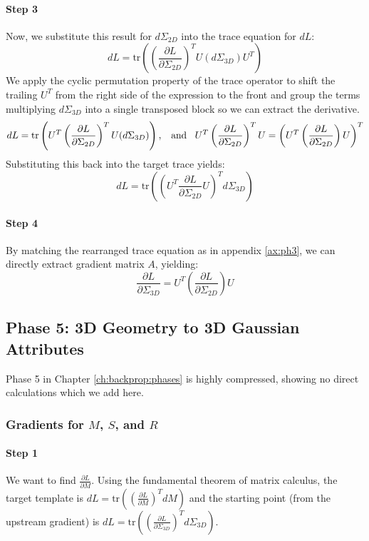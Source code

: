 \paragraph{Step 3} Now, we substitute this result for $d\Sigma_{2D}$ into the trace equation for $dL$:
$$dL = \text{tr}\left( \left(\frac{\partial L}{\partial \Sigma_{2D}}\right)^T U (d\Sigma_{3D}) U^T \right)$$
We apply the cyclic permutation property of the trace operator to shift the trailing $U^T$ from the right side of the expression to the front and group the terms multiplying $d\Sigma_{3D}$ into a single transposed block so we can extract the derivative.
$$dL = \text{tr}\left( U^T \left(\frac{\partial L}{\partial \Sigma_{2D}}\right)^T U (d\Sigma_{3D}) \right), \hspace{3mm}\text{and}\hspace{3mm}
U^T \left(\frac{\partial L}{\partial \Sigma_{2D}}\right)^T U =
\left( U^T \left(\frac{\partial L}{\partial \Sigma_{2D}}\right) U \right)^T
$$
Substituting this back into the target trace yields:
$$dL = \text{tr}\left( \left( U^T \frac{\partial L}{\partial \Sigma_{2D}} U \right)^T d\Sigma_{3D} \right)$$

\paragraph{Step 4} By matching the rearranged trace equation as in appendix \ref{ax:ph3}, we can directly extract gradient matrix $A$, yielding:
$$\frac{\partial L}{\partial \Sigma_{3D}} = U^T \left(\frac{\partial L}{\partial \Sigma_{2D}}\right) U$$

\subsection{Phase 5: 3D Geometry to 3D Gaussian Attributes}
\label{ax:ph5}

Phase 5 in Chapter \ref{ch:backprop:phases} is highly compressed, showing no direct calculations which we add here.

\subsubsection{Gradients for $M$, $S$, and $R$}

\paragraph{Step 1} We want to find $\frac{\partial L}{\partial M}$. Using the fundamental theorem of matrix calculus, the target template is $dL = \text{tr}\left( \left(\frac{\partial L}{\partial M}\right)^T dM \right)$ and the starting point (from the upstream gradient) is $dL = \text{tr}\left( \left(\frac{\partial L}{\partial \Sigma_{3D}}\right)^T d\Sigma_{3D} \right)$.

